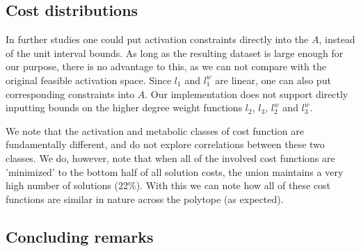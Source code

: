 
\subsection{Cost distributions} %
\label{sec:cost_distributions}
In further studies one could put activation constraints directly into the $A$, instead of the unit interval bounds. As long as the resulting dataset is large enough for our purpose, there is no advantage to this, as we can not compare with the original feasible activation space. Since $l_1$ and $l_1^w$ are linear, one can also put corresponding constraints into $A$. Our implementation does not support directly inputting bounds on the higher degree weight functions $l_2$, $l_3$, $l_2^w$ and $l_3^w$.

We note that the activation and metabolic classes of cost function are fundamentally different, and do not explore correlations between these two classes. We do, however, note that when all of the involved cost functions are 'minimized' to the bottom half of all solution costs, the union maintains a very high number of solutions (22\%). With this we can note how all of these cost functions are similar in nature across the polytope (as expected).

\subsection{Concluding remarks} %
\label{ssub:concluding_remarks}

